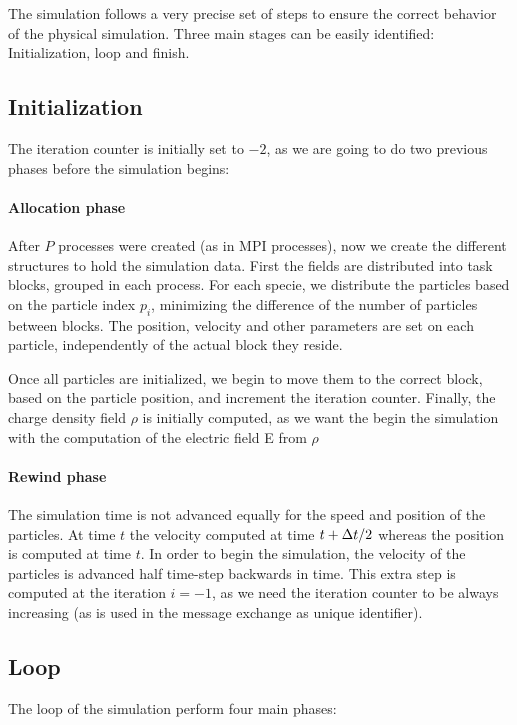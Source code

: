 The simulation follows a very precise set of steps to ensure the correct 
behavior of the physical simulation. Three main stages can be easily identified: 
Initialization, loop and finish.

\subsection{Initialization}

The iteration counter is initially set to $-2$, as we are going to do two 
previous phases before the simulation begins:

\paragraph{Allocation phase}
After $P$ processes were created (as in MPI processes), now we create the 
different structures to hold the simulation data. First the fields are 
distributed into task blocks, grouped in each process. For each specie, we 
distribute the particles based on the particle index $p_i$, minimizing the 
difference of the number of particles between blocks. The position, velocity and 
other parameters are set on each particle, independently of the actual block 
they reside.

Once all particles are initialized, we begin to move them to the correct block, 
based on the particle position, and increment the iteration counter. Finally, 
the charge density field $\rho$ is initially computed, as we want the begin the 
simulation with the computation of the electric field E from $\rho$

\paragraph{Rewind phase} The simulation time is not advanced equally for the 
speed and position of the particles. At time $t$ the velocity computed at time 
$t + \Delta t/2$ whereas the position is computed at time $t$. In order to begin the 
simulation, the velocity of the particles is advanced half time-step backwards 
in time. This extra step is computed at the iteration $i=-1$, as we need the 
iteration counter to be always increasing (as is used in the message exchange as 
unique identifier).

\subsection{Loop}

The loop of the simulation perform four main phases:

